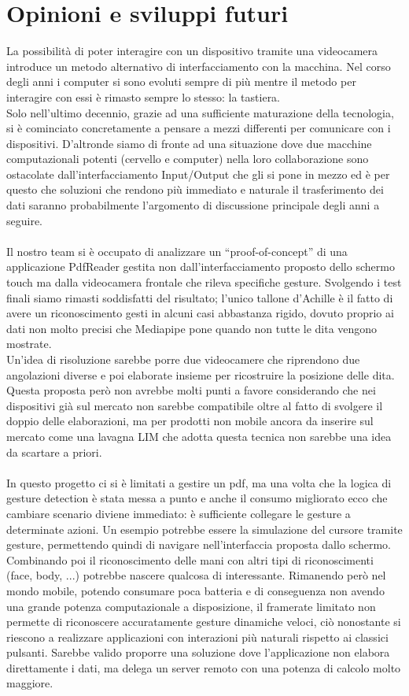 \section{Opinioni e sviluppi futuri}
La possibilità di poter interagire con un dispositivo tramite una videocamera introduce un metodo alternativo di 
interfacciamento con la macchina. Nel corso degli anni i computer si sono evoluti sempre di più mentre il 
metodo per interagire con essi è rimasto sempre lo stesso: la tastiera.\\
Solo nell'ultimo decennio, grazie ad una 
sufficiente maturazione della tecnologia, si è cominciato concretamente a pensare a mezzi differenti per comunicare 
con i dispositivi. D'altronde siamo di fronte ad una situazione dove due macchine computazionali potenti (cervello e 
computer) nella loro collaborazione sono ostacolate dall'interfacciamento Input/Output che gli si pone in mezzo ed è
per questo che soluzioni che rendono più immediato e naturale il trasferimento dei dati saranno probabilmente l'argomento 
di discussione principale degli anni a seguire.\\
\\
\noindent Il nostro team si è occupato di analizzare un “proof-of-concept” di una 
applicazione PdfReader gestita non dall'interfacciamento proposto dello schermo touch ma dalla videocamera 
frontale che rileva specifiche gesture. Svolgendo i test finali siamo rimasti soddisfatti del risultato; l'unico tallone 
d'Achille è il fatto di avere un riconoscimento gesti in alcuni casi abbastanza rigido, dovuto proprio ai dati non molto 
precisi che Mediapipe pone quando non tutte le dita vengono mostrate.\\
Un'idea di risoluzione sarebbe porre due videocamere che riprendono due angolazioni diverse e poi 
elaborate insieme per ricostruire la posizione delle dita. Questa proposta però non avrebbe molti punti a favore 
considerando che nei dispositivi già sul mercato non sarebbe compatibile oltre al fatto di svolgere il doppio delle 
elaborazioni, ma per prodotti non mobile ancora da inserire sul mercato come una lavagna LIM che adotta questa 
tecnica non sarebbe una idea da scartare a priori.\\
\\
\noindent In questo progetto ci si è limitati a gestire un pdf, ma una volta che la logica di gesture detection è stata messa a punto 
e anche il consumo migliorato ecco che cambiare scenario diviene immediato: è sufficiente collegare le gesture a determinate 
azioni. Un esempio potrebbe essere la simulazione del cursore tramite gesture, permettendo quindi di navigare nell'interfaccia proposta 
dallo schermo. Combinando poi il riconoscimento delle mani con altri tipi di riconoscimenti (face, body, ...) potrebbe 
nascere qualcosa di interessante. Rimanendo però nel mondo mobile, potendo consumare poca batteria e di 
conseguenza non avendo una grande potenza computazionale a disposizione, il framerate limitato non permette di riconoscere accuratamente gesture dinamiche 
veloci, ciò nonostante si riescono a realizzare applicazioni con interazioni più naturali rispetto ai classici pulsanti. Sarebbe valido proporre una soluzione 
dove l'applicazione non elabora direttamente i dati, ma delega un server remoto con una potenza di calcolo molto maggiore.